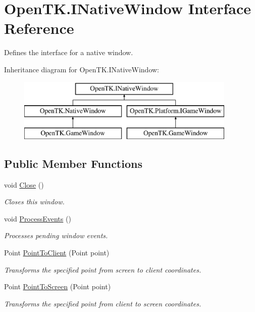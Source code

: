 \hypertarget{interface_open_t_k_1_1_i_native_window}{\section{Open\-T\-K.\-I\-Native\-Window Interface Reference}
\label{interface_open_t_k_1_1_i_native_window}
}


Defines the interface for a native window.  


Inheritance diagram for Open\-T\-K.\-I\-Native\-Window\-:\begin{figure}[H]
\begin{center}
\leavevmode
\includegraphics[height=3.000000cm]{interface_open_t_k_1_1_i_native_window}
\end{center}
\end{figure}
\subsection*{Public Member Functions}
\begin{DoxyCompactItemize}
\item 
void \hyperlink{interface_open_t_k_1_1_i_native_window_a1ccc061d19e83d00f29b50f27263fcfe}{Close} ()
\begin{DoxyCompactList}\small\item\em Closes this window. \end{DoxyCompactList}\item 
void \hyperlink{interface_open_t_k_1_1_i_native_window_a23e81e7f8c02cc874c3e23f957909171}{Process\-Events} ()
\begin{DoxyCompactList}\small\item\em Processes pending window events. \end{DoxyCompactList}\item 
Point \hyperlink{interface_open_t_k_1_1_i_native_window_ae3d487a830389a57f8732d4de101a063}{Point\-To\-Client} (Point point)
\begin{DoxyCompactList}\small\item\em Transforms the specified point from screen to client coordinates. \end{DoxyCompactList}\item 
Point \hyperlink{interface_open_t_k_1_1_i_native_window_a24ec247d43eab609220b1b581dbad519}{Point\-To\-Screen} (Point point)
\begin{DoxyCompactList}\small\item\em Transforms the specified point from client to screen coordinates. \end{DoxyCompactList}\end{DoxyCompactItemize}
